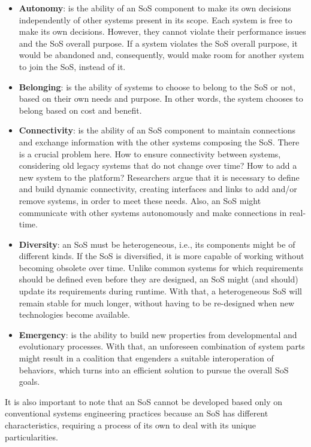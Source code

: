 \begin{itemize}
\item \textbf{Autonomy}: is the ability of an SoS component to make its own decisions independently of other systems present in its scope. Each system is free to make its own decisions. However, they cannot violate their performance issues and the SoS overall purpose. If a system violates the SoS overall purpose, it would be abandoned and, consequently, would make room for another system to join the SoS, instead of it.

\item \textbf{Belonging}: is the ability of systems to choose to belong to the SoS or not, based on their own needs and purpose. In other words, the system chooses to belong based on cost and benefit.

\item \textbf{Connectivity}: is the ability of an SoS component to maintain connections and exchange information with the other systems composing the SoS. There is a crucial problem here. How to ensure connectivity between systems, considering old legacy systems that do not change over time? How to add a new system to the platform? Researchers argue that it is necessary to define and build dynamic connectivity, creating interfaces and links to add and/or remove systems, in order to meet these needs. Also, an SoS might communicate with other systems autonomously and make connections in real-time.

\item \textbf{Diversity}: an SoS must be heterogeneous, i.e., its components might be of different kinds. If the SoS is diversified, it is more capable of working without becoming obsolete over time. Unlike common systems for which requirements should be defined even before they are designed, an SoS might (and should) update its requirements during runtime. With that, a heterogeneous SoS will remain stable for much longer, without having to be re-designed when new technologies become available. 

\item \textbf{Emergency}: is the ability to build new properties from developmental and evolutionary processes. With that, an unforeseen combination of system parts might result in a coalition that engenders a suitable interoperation of behaviors, which turns into an efficient solution to pursue the overall SoS goals. 
\end{itemize}

It is also important to note that an SoS cannot be developed based only on conventional systems engineering practices because an SoS has different characteristics, requiring a process of its own to deal with its unique particularities. 



